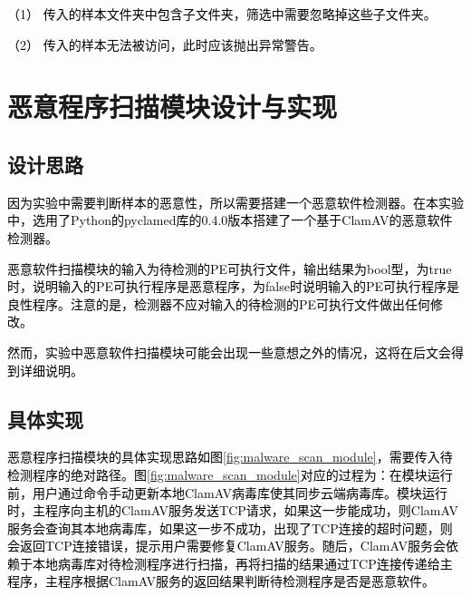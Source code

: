 \textcolor{black}{（1）	传入的样本文件夹中包含子文件夹，筛选中需要忽略掉这些子文件夹。}

\textcolor{black}{（2）	传入的样本无法被访问，此时应该抛出异常警告。}

\section{恶意程序扫描模块设计与实现}

\subsection{设计思路}

\textcolor{black}{因为实验中需要判断样本的恶意性，所以需要搭建一个恶意软件检测器。在本实验中，选用了Python的pyclamed库的0.4.0版本搭建了一个基于ClamAV的恶意软件检测器。}

\textcolor{black}{恶意软件扫描模块的输入为待检测的PE可执行文件，输出结果为bool型，为true时，说明输入的PE可执行程序是恶意程序，为false时说明输入的PE可执行程序是良性程序。注意的是，检测器不应对输入的待检测的PE可执行文件做出任何修改。}

\textcolor{black}{然而，实验中恶意软件扫描模块可能会出现一些意想之外的情况，这将在后文会得到详细说明。}

\subsection{具体实现}

\textcolor{black}{恶意程序扫描模块的具体实现思路如图\ref{fig:malware_scan_module}，需要传入待检测程序的绝对路径。图\ref{fig:malware_scan_module}对应的过程为：在模块运行前，用户通过命令手动更新本地ClamAV病毒库使其同步云端病毒库。模块运行时，主程序向主机的ClamAV服务发送TCP请求，如果这一步能成功，则ClamAV服务会查询其本地病毒库，如果这一步不成功，出现了TCP连接的超时问题，则会返回TCP连接错误，提示用户需要修复ClamAV服务。随后，ClamAV服务会依赖于本地病毒库对待检测程序进行扫描，再将扫描的结果通过TCP连接传递给主程序，主程序根据ClamAV服务的返回结果判断待检测程序是否是恶意软件。}

